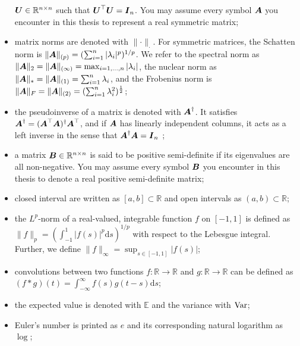 \begin{itemize}
          $\boldsymbol{U} \in \mathbb{R}^{n \times n}$ such that $\boldsymbol{U}^{\top} \boldsymbol{U} = \boldsymbol{I}_n$.
          You may assume every symbol $\boldsymbol{A}$ you encounter in this thesis to
          represent a real symmetric matrix;
    \item matrix norms are denoted with $\lVert \cdot \rVert _{\cdot}$.
          For symmetric matrices, the Schatten norm is
          $\lVert \boldsymbol{A} \rVert _{(p)} = (\sum_{i=1}^n |\lambda_i|^p)^{1/p}$.
          We refer to the spectral norm as
          $\lVert \boldsymbol{A} \rVert _2 = \lVert \boldsymbol{A} \rVert _{(\infty)} = \max_{i=1,\dots,n}|\lambda_i|$,
          the nuclear norm as $\lVert \boldsymbol{A} \rVert _{\ast} = \lVert \boldsymbol{A} \rVert _{(1)} = \sum_{i=1}^{n} \lambda_i$,
          and the Frobenius norm
          is $\lVert \boldsymbol{A} \rVert _F = \lVert \boldsymbol{A} \rVert _{(2)} = (\sum_{i=1}^{n} \lambda_i^2)^{\frac{1}{2}}$;
    \item the pseudoinverse of a matrix is denoted with $\boldsymbol{A}^{\dagger}$. It
          satisfies $\boldsymbol{A}^{\dagger}=(\boldsymbol{A}^{\top} \boldsymbol{A})^{\dagger} \boldsymbol{A}^{\top}$,
          and if $\boldsymbol{A}$ has linearly independent columns, it acts as a left inverse
          in the sense that $\boldsymbol{A}^{\dagger} \boldsymbol{A} = \boldsymbol{I}_n$ \cite{penrose1955pseudo};
    \item a matrix $\boldsymbol{B} \in \mathbb{R}^{n \times n}$ is said to be positive
          semi-definite if its eigenvalues are all non-negative. You may assume every
          symbol $\boldsymbol{B}$ you encounter in this thesis to denote a real positive
          semi-definite matrix;
    \item closed interval are written as $[a, b] \subset \mathbb{R}$ and open
          intervals as $(a, b) \subset \mathbb{R}$;
    \item the $L^p$-norm of a real-valued, integrable function $f$ on $[-1, 1]$ is defined as
          $\lVert f \rVert _{p} = (\int_{-1}^{1} |f(s)|^p \mathrm{d}s)^{1/p}$ with
          respect to the Lebesgue integral. Further, we define $\lVert f \rVert _{\infty} = \sup_{s \in [-1, 1]} |f(s)|$;
    \item convolutions between two functions $f:\mathbb{R} \to \mathbb{R}$ and $g:\mathbb{R} \to \mathbb{R}$
          can be defined as $(f \ast g)(t) = \int_{-\infty}^{\infty}f(s)g(t-s)\mathrm{d}s$;
    \item the expected value is denoted with $\mathbb{E}$ and the variance with $\operatorname{Var}$;
    \item Euler's number is printed as $e$ and its corresponding natural logarithm as $\log$;

\end{itemize}
